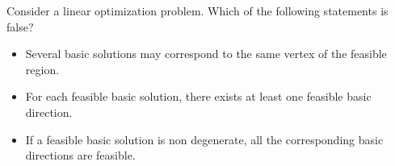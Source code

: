 Consider a linear optimization problem. Which of the following statements is false?

\begin{itemize}
\item[(a)]{Several basic solutions may correspond to the same vertex of the feasible region.}
\item[(b)]{For each feasible basic solution, there exists at least one feasible basic direction.}
\item[(c)]{If a feasible basic solution is non degenerate, all the corresponding basic directions are feasible.}
\end{itemize}


